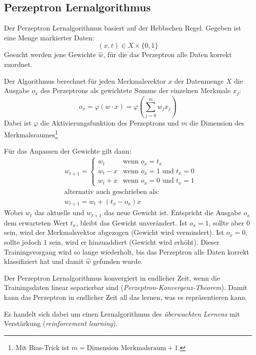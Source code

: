 \subsection*{Perzeptron Lernalgorithmus}
Der Perzeptron Lernalgorithmus basiert auf der Hebbschen Regel. Gegeben ist eine Menge markierter Daten:
\[
	(x,t) \in X \times \{0,1\}
\]
Gesucht werden jene Gewichte $\hat{w}$, für die das Perzeptron alle Daten korrekt zuordnet.

Der Algorithmus berechnet für jeden Merkmalsvektor $x$ der Datenmenge $X$ die Ausgabe $o_x$ des Perzeptrons als gewichtete Summe der einzelnen Merkmale $x_j$:
\[
	o_x = \varphi(w \cdot x) = \varphi( \sum_{j=0}^{m} w_j x_j)
\]
Dabei ist $\varphi$ die Aktivierungsfunktion des Perzeptrons und $m$ die Dimension des Merkmalsraumes\footnote{Mit Bias-Trick ist $m = \text{Dimension Merkmalsraum} + 1$.}

Für das Anpassen der Gewichte gilt dann:
\begin{align*}
	&w_{t+1} =
	\begin{cases}
		w_{t} &\text{wenn } o_x = t_x \\
		w_{t} - x &\text{wenn } o_x = 1 \text{ und } t_x = 0\\
		w_{t} + x &\text{wenn } o_x = 0 \text{ und } t_x = 1
	\end{cases} \\
	&\text{alternativ auch geschrieben als:} \\
	&w_{t+1} = w_{t} + (t_x - o_x) x
\end{align*}
Wobei $w_{t}$ das aktuelle und $w_{t+1}$ das neue Gewicht ist. Entspricht die Ausgabe $o_x$ dem erwarteten Wert $t_x$, bleibt das Gewicht unverändert. Ist $o_x = 1$, sollte aber $0$ sein, wird der Merkmalsvektor abgezogen (Gewicht wird vermindert). Ist $o_x = 0$, sollte jedoch $1$ sein, wird er hinzuaddiert (Gewicht wird erhöht).
Dieser Trainingsvorgang wird so lange wiederholt, bis das Perzeptron alle Daten korrekt klassifiziert hat und damit $\hat{w}$ gefunden wurde.

Der Perzeptron Lernalgorithmus konvergiert in endlicher Zeit, wenn die Trainingsdaten linear separierbar sind (\emph{Perzeptron-Konvergenz-Theorem}). Damit kann das Perzeptron in endlicher Zeit all das lernen, was es repräsentieren kann.

Es handelt sich dabei um einen Lernalgorithmus des \emph{überwachten Lernens} mit Verstärkung (\emph{reinforcement learning}).

